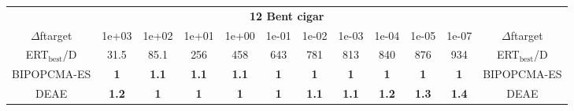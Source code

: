 \begin{tabular}{cccccccccccc}
 & \multicolumn{10}{c}{{\normalsize \textbf{12 Bent cigar}}}\\
$\Delta$ftarget& 1e+03& 1e+02& 1e+01& 1e+00& 1e-01& 1e-02& 1e-03& 1e-04& 1e-05& 1e-07 & $\Delta$ftarget \\
ERT$_{\textrm{best}}$/D& 31.5& 85.1& 256& 458& 643& 781& 813& 840& 876& 934 & ERT$_{\textrm{best}}$/D \\
\hline
BIPOPCMA-ES & \textbf{1} & \textbf{1.1} & \textbf{1.1} & \textbf{1.1} & \textbf{1} & \textbf{1} & \textbf{1} & \textbf{1} & \textbf{1} & \textbf{1} & BIPOPCMA-ES \cite{add_an_entry_for_BIPOPCMA-ES_in_bbob.bib}\\
DEAE & \textbf{1.2} & \textbf{1} & \textbf{1} & \textbf{1} & \textbf{1} & \textbf{1.1} & \textbf{1.1} & \textbf{1.2} & \textbf{1.3} & \textbf{1.4} & DEAE \cite{add_an_entry_for_DEAE_in_bbob.bib}
\end{tabular}
